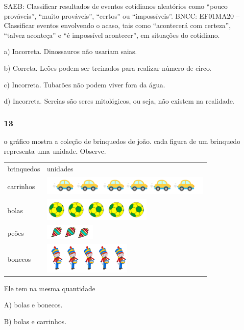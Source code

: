 SAEB: Classificar resultados de eventos cotidianos aleatórios como
``pouco prováveis'', ``muito prováveis'', ``certos'' ou ``impossíveis''.
BNCC: EF01MA20 -- Classificar eventos envolvendo o acaso, tais como
``acontecerá com certeza'', ``talvez aconteça'' e ``é impossível
acontecer'', em situações do cotidiano.

a) Incorreta. Dinossauros não usariam saias.

b) Correta. Leões podem ser treinados para realizar número de circo.

c) Incorreta. Tubarões não podem viver fora da água.

d) Incorreta. Sereias são seres mitológicos, ou seja, não existem na
realidade.

\subsubsection{13}\label{section-114}

o gráfico mostra a coleção de brinquedos de joão. cada figura de um
brinquedo representa uma unidade. Observe.

\begin{longtable}[]{@{}ll@{}}
\toprule
brinquedos & unidades\tabularnewline
carrinhos &
\includegraphics[width=3.32338in,height=0.38547in]{media/image129.png}\tabularnewline
bolas &
\includegraphics[width=2.12138in,height=0.44045in]{media/image132.png}\tabularnewline
peões &
\includegraphics[width=0.97976in,height=0.30538in]{media/image134.png}\tabularnewline
bonecos &
\includegraphics[width=1.70172in,height=0.60128in]{media/image135.png}\tabularnewline
\bottomrule
\end{longtable}

Ele tem na mesma quantidade

A) bolas e bonecos.

B) bolas e carrinhos.


